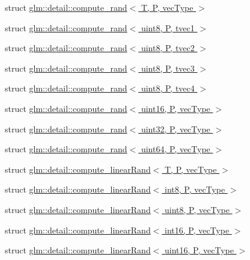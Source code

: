 \begin{DoxyCompactItemize}
\item 
struct \hyperlink{structglm_1_1detail_1_1compute__rand}{glm\+::detail\+::compute\+\_\+rand$<$ T, P, vec\+Type $>$}
\item 
struct \hyperlink{structglm_1_1detail_1_1compute__rand_3_01uint8_00_01P_00_01tvec1_01_4}{glm\+::detail\+::compute\+\_\+rand$<$ uint8, P, tvec1 $>$}
\item 
struct \hyperlink{structglm_1_1detail_1_1compute__rand_3_01uint8_00_01P_00_01tvec2_01_4}{glm\+::detail\+::compute\+\_\+rand$<$ uint8, P, tvec2 $>$}
\item 
struct \hyperlink{structglm_1_1detail_1_1compute__rand_3_01uint8_00_01P_00_01tvec3_01_4}{glm\+::detail\+::compute\+\_\+rand$<$ uint8, P, tvec3 $>$}
\item 
struct \hyperlink{structglm_1_1detail_1_1compute__rand_3_01uint8_00_01P_00_01tvec4_01_4}{glm\+::detail\+::compute\+\_\+rand$<$ uint8, P, tvec4 $>$}
\item 
struct \hyperlink{structglm_1_1detail_1_1compute__rand_3_01uint16_00_01P_00_01vecType_01_4}{glm\+::detail\+::compute\+\_\+rand$<$ uint16, P, vec\+Type $>$}
\item 
struct \hyperlink{structglm_1_1detail_1_1compute__rand_3_01uint32_00_01P_00_01vecType_01_4}{glm\+::detail\+::compute\+\_\+rand$<$ uint32, P, vec\+Type $>$}
\item 
struct \hyperlink{structglm_1_1detail_1_1compute__rand_3_01uint64_00_01P_00_01vecType_01_4}{glm\+::detail\+::compute\+\_\+rand$<$ uint64, P, vec\+Type $>$}
\item 
struct \hyperlink{structglm_1_1detail_1_1compute__linearRand}{glm\+::detail\+::compute\+\_\+linear\+Rand$<$ T, P, vec\+Type $>$}
\item 
struct \hyperlink{structglm_1_1detail_1_1compute__linearRand_3_01int8_00_01P_00_01vecType_01_4}{glm\+::detail\+::compute\+\_\+linear\+Rand$<$ int8, P, vec\+Type $>$}
\item 
struct \hyperlink{structglm_1_1detail_1_1compute__linearRand_3_01uint8_00_01P_00_01vecType_01_4}{glm\+::detail\+::compute\+\_\+linear\+Rand$<$ uint8, P, vec\+Type $>$}
\item 
struct \hyperlink{structglm_1_1detail_1_1compute__linearRand_3_01int16_00_01P_00_01vecType_01_4}{glm\+::detail\+::compute\+\_\+linear\+Rand$<$ int16, P, vec\+Type $>$}
\item 
struct \hyperlink{structglm_1_1detail_1_1compute__linearRand_3_01uint16_00_01P_00_01vecType_01_4}{glm\+::detail\+::compute\+\_\+linear\+Rand$<$ uint16, P, vec\+Type $>$}

\end{DoxyCompactItemize}
